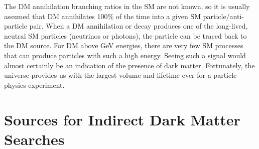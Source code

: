 The DM annihilation branching ratios in the SM are not known, so it is usually assumed that DM annihilates 100\% of the time into a given SM particle/anti-particle pair.
When a DM annihilation or decay produces one of the long-lived, neutral SM particles (neutrinos or photons), the particle can be traced back to the DM source.
For DM above GeV energies, there are very few SM processes that can produce particles with such a high energy.
Seeing such a signal would almost certainly be an indication of the presence of dark matter.
Fortunately, the universe  provides us with the largest volume and lifetime ever for a particle physics experiment.

\section{Sources for Indirect Dark Matter Searches\label{sec:dm_targets}}

\begin{figure}
\end{figure}

